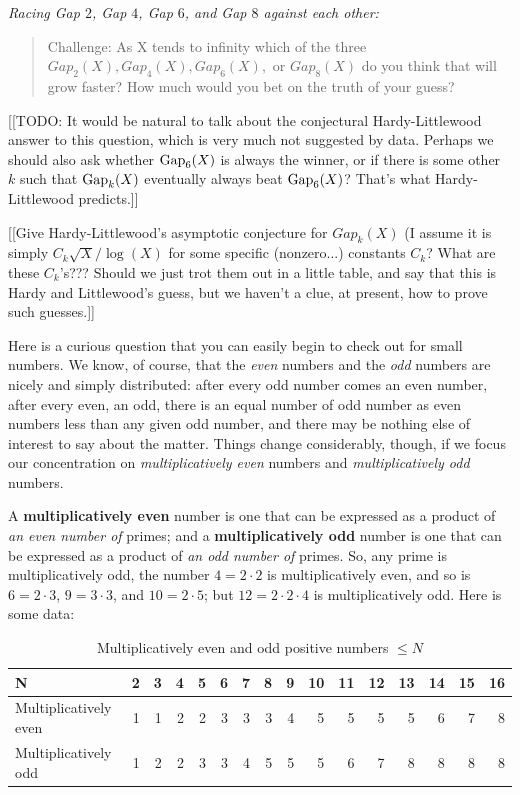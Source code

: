 \documentclass[11pt,draft]{article}
\theoremstyle{plain}
\theoremstyle{definition}
\numberwithin{equation}{section}
\numberwithin{figure}{section}
\numberwithin{table}{section}
\begin{document}
{\em Racing Gap $2$,  Gap $4$, Gap $6$, and Gap $8$ against each other:} 
  
\begin{quote}
  Challenge: As X tends to infinity which of the three $Gap_2(X),
  Gap_4(X), Gap_6(X),$ or $Gap_8(X)$ do you think that will grow
  faster? How much would you bet on the truth of your guess?
\end{quote}
  
[[TODO: It would be natural to talk about the
conjectural Hardy-Littlewood answer to this question, which is very
much not suggested by data.  Perhaps we should also
ask whether ${\rm Gap}_6(X)$ is always the winner, or if there is some
other $k$ such that ${\rm Gap}_k(X)$ eventually always beat ${\rm
  Gap}_6(X)$?  That's what Hardy-Littlewood predicts.]]

[[Give Hardy-Littlewood's asymptotic conjecture for $Gap_k(X)$ (I
assume it is simply $C_k{\sqrt X}/\log(X)$ for some specific
(nonzero...)  constants $C_k$? What are these $C_k$'s???  Should we
just trot them out in a little table, and say that this is Hardy and
Littlewood's guess, but we haven't a clue, at present, how to prove
such guesses.]]


Here is a curious question that you can easily begin to check out for
small numbers. We know, of course, that the {\em even} numbers and the
{\em odd} numbers are nicely and simply distributed: after every odd
number comes an even number, after every even, an odd, there is an
equal number of odd number as even numbers less than any given odd
number, and there may be nothing else of interest to say about the
matter.  Things change considerably, though, if we focus our
concentration on {\em multiplicatively even} numbers and {\em
  multiplicatively odd} numbers.
  
  
A {\bf multiplicatively even} number is one that can be expressed as a
product of {\em an even number of} primes; and a {\bf multiplicatively
  odd} number is one that can be expressed as a product of {\em an odd
  number of} primes.  So, any prime is multiplicatively odd, the
number $4 = 2\cdot 2$ is multiplicatively even, and so is $6=2\cdot
3$, $9=3\cdot 3$, and $10= 2\cdot 5$; but $12=2\cdot 2\cdot 4$ is
multiplicatively odd.  Here is some data:
   
  \begin{table} \caption{Multiplicatively even and odd positive numbers $\le N$}
  \begin{center}
 
\begin{tabular}{|l|r|r|r|r|r|r|r|r|r|r|r|r|r|r|r|}
\hline
N & 2 & 3 & 4 & 5  & 6 & 7 & 8 & 9 & 10 & 11 & 12 & 13 & 14 & 15 & 16  \\ \hline
Multiplicatively even & 1 & 1 & 2 & 2  & 3 & 3 & 3 & 4 & 5 & 5 & 5 & 5 & 6 & 7 & 8 \\ \hline
Multiplicatively odd & 1 & 2 & 2 & 3  & 3 & 4 & 5 & 5 & 5 & 6 & 7 & 8 & 8 & 8 & 8 \\ \hline
\end{tabular}
\end{center}
\end{table}
\end{document}
